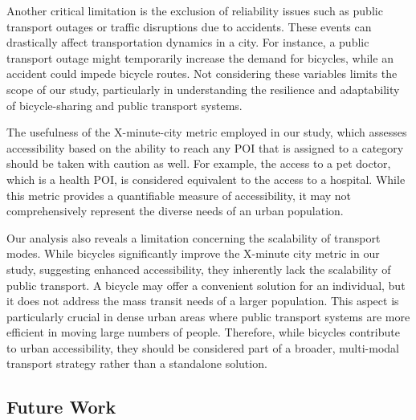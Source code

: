 Another critical limitation is the exclusion of reliability issues such as public transport outages or traffic disruptions due to accidents. 
These events can drastically affect transportation dynamics in a city. 
For instance, a public transport outage might temporarily increase the demand for bicycles, while an accident could impede bicycle routes. 
Not considering these variables limits the scope of our study, particularly in understanding the resilience and adaptability of bicycle-sharing and public transport systems.

The usefulness of the X-minute-city metric employed in our study, which assesses accessibility based on the ability to reach any POI that is assigned to a category should be taken with caution as well.
For example, the access to a pet doctor, which is a health POI, is considered equivalent to the access to a hospital.
While this metric provides a quantifiable measure of accessibility, it may not comprehensively represent the diverse needs of an urban population. 

Our analysis also reveals a limitation concerning the scalability of transport modes. 
While bicycles significantly improve the X-minute city metric in our study, suggesting enhanced accessibility, they inherently lack the scalability of public transport. 
A bicycle may offer a convenient solution for an individual, but it does not address the mass transit needs of a larger population. 
This aspect is particularly crucial in dense urban areas where public transport systems are more efficient in moving large numbers of people. 
Therefore, while bicycles contribute to urban accessibility, they should be considered part of a broader, multi-modal transport strategy rather than a standalone solution.


\subsection{Future Work}
\label{sec:future_work}

